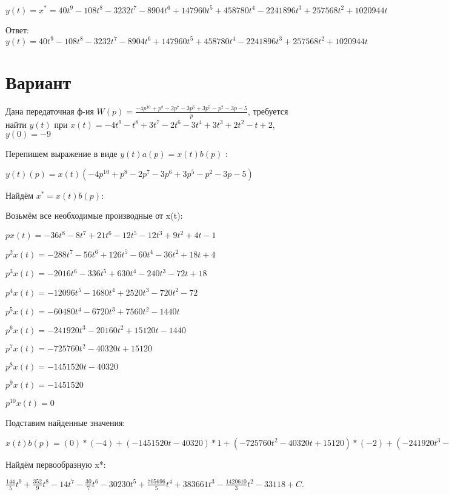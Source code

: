 \documentclass{article}
\begin{document}
$y(t)=x^*=40t^{9}-108t^{8}-3232t^{7}-8904t^{6}+147960t^{5}+458780t^{4}-2241896t^{3}+257568t^{2}+1020944t$

Ответ: $y(t) = 40t^{9}-108t^{8}-3232t^{7}-8904t^{6}+147960t^{5}+458780t^{4}-2241896t^{3}+257568t^{2}+1020944t$

\section{Вариант}

Дана передаточная ф-ия $W(p)=\frac{-4p^{10}+p^{8}-2p^{7}-3p^{6}+3p^{5}-p^{2}-3p-5}{p}$, требуется найти $y(t)$ при $x(t)=-4t^{9}-t^{8}+3t^{7}-2t^{6}-3t^{4}+3t^{3}+2t^{2}-t+2$, $y(0)=-9$

Перепишем выражение в виде $y(t)a(p)=x(t)b(p)$ :

$y(t)(p)=x(t)(-4p^{10}+p^{8}-2p^{7}-3p^{6}+3p^{5}-p^{2}-3p-5)$

Найдём $x^*=x(t)b(p)$:

Возьмём все необходимые производные от x(t):

$px(t)=-36t^{8}-8t^{7}+21t^{6}-12t^{5}-12t^{3}+9t^{2}+4t-1$

$p^2x(t)=-288t^{7}-56t^{6}+126t^{5}-60t^{4}-36t^{2}+18t+4$

$p^3x(t)=-2016t^{6}-336t^{5}+630t^{4}-240t^{3}-72t+18$

$p^4x(t)=-12096t^{5}-1680t^{4}+2520t^{3}-720t^{2}-72$

$p^5x(t)=-60480t^{4}-6720t^{3}+7560t^{2}-1440t$

$p^6x(t)=-241920t^{3}-20160t^{2}+15120t-1440$

$p^7x(t)=-725760t^{2}-40320t+15120$

$p^8x(t)=-1451520t-40320$

$p^9x(t)=-1451520$

$p^10x(t)=0$

Подставим найденные значения:

$x(t)b(p) = (0)*(-4)+(-1451520t-40320)*1+(-725760t^{2}-40320t+15120)*(-2)+(-241920t^{3}-20160t^{2}+15120t-1440)*(-3)+(-60480t^{4}-6720t^{3}+7560t^{2}-1440t)*3+(-288t^{7}-56t^{6}+126t^{5}-60t^{4}-36t^{2}+18t+4)*(-1)+(-36t^{8}-8t^{7}+21t^{6}-12t^{5}-12t^{3}+9t^{2}+4t-1)*(-3)+(-36t^{8}-8t^{7}+21t^{6}-12t^{5}-12t^{3}+9t^{2}+4t-1)*(-5)=288t^{8}+352t^{7}-112t^{6}-30t^{5}-181380t^{4}+705696t^{3}+1534644t^{2}-1420610t$





Найдём первообразную x*:

$\frac{144}{5}t^{9}+\frac{352}{9}t^{8}-14t^{7}-\frac{30}{7}t^{6}-30230t^{5}+\frac{705696}{5}t^{4}+383661t^{3}-\frac{1420610}{3}t^{2}-33118+C.$
\end{document}
